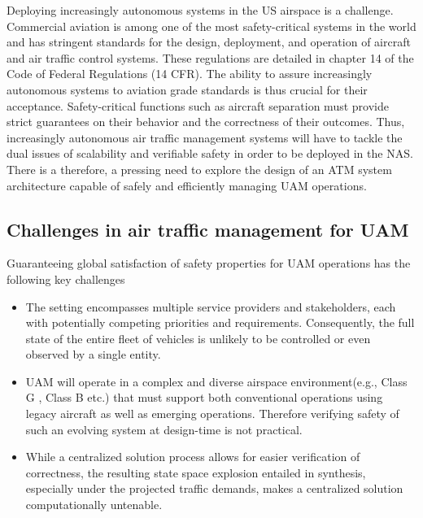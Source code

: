 Deploying increasingly autonomous systems in the US airspace is a challenge. Commercial aviation is among one of the most safety-critical systems in the world and has stringent standards for the design, deployment, and operation of aircraft and air traffic control systems. These regulations are detailed in chapter 14 of the Code of Federal Regulations (14 CFR). The ability to assure increasingly autonomous systems to aviation grade standards is thus crucial for their acceptance.  Safety-critical functions such as aircraft separation must provide strict guarantees on their behavior and the correctness of their outcomes.  Thus, increasingly autonomous air traffic management systems will have to tackle the dual issues of scalability and verifiable safety in order to be deployed in the NAS. There is a therefore, a pressing need to explore the design of an ATM system architecture capable of safely and efficiently managing UAM operations. 

\subsection{Challenges in air traffic management for UAM}

Guaranteeing global satisfaction of safety properties for UAM operations has the following key challenges

\begin{itemize}
    \item The setting encompasses multiple service providers and stakeholders, each with potentially competing priorities and requirements. Consequently, the full state of the entire fleet of vehicles is unlikely to be controlled or even observed by a single entity. 
    \item UAM will operate in a complex and diverse airspace environment(e.g., Class G \cite{FAA2014}, Class B etc.) that must support both conventional operations using legacy aircraft as well as emerging operations. Therefore verifying safety of such an evolving system at design-time is not practical.
    \item While a centralized solution process allows for easier verification of correctness, the resulting state space explosion entailed in synthesis, especially under the projected traffic demands, makes a centralized solution computationally untenable. 
\end{itemize}


